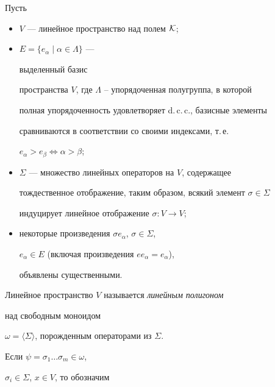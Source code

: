 \begin{defn}


Пусть


\begin{itemize}


\item[(i)] $V$ --- линейное пространство над полем ${\cal K}$;


\item[(ii)] $E=\lbrace e_{\alpha}\mid\alpha\in\Lambda\rbrace$ ---


выделенный базис


пространства $V$, где $\Lambda$ -- упорядоченная полугруппа, в которой


полная упорядоченность удовлетворяет d.\,c.\,c., базисные элементы


сравниваются в соответствии со своими индексами, т.\,е.


$e_{\alpha}>e_{\beta}\Leftrightarrow\alpha >\beta$;


\item[(iii)] $\Sigma$ --- множество линейных операторов на $V$, содержащее


тождественное отображение, таким образом, всякий элемент $\sigma\in\Sigma$


индуцирует линейное отображение $\sigma:V\rightarrow V$;


\item[(iv)] некоторые произведения $\sigma e_{\alpha}$, $\sigma\in\Sigma$,


$e_{\alpha}\in E$ (включая произведения $ee_{\alpha}=e_{\alpha}$),


объявлены существенными.


\end{itemize}





Линейное пространство $V$ называется {\it линейным полигоном}


над свободным моноидом\linebreak


$\omega=\langle\Sigma\rangle$, порожденным операторами из $\Sigma$.


\end{defn}





Если $\psi=\sigma_{1}\dotsc\sigma_{m}\in\omega$,


$\sigma_{i}\in\Sigma$, $x\in V$, то обозначим


